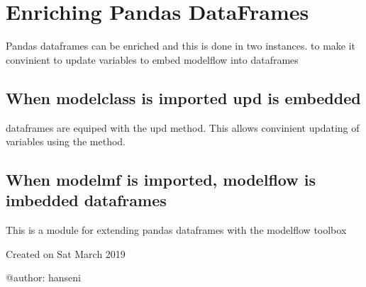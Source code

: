 \documentclass[letterpaper,10pt,english]{sphinxmanual}
\begin{document}
\chapter{Enriching Pandas DataFrames}
\label{\detokenize{index:enriching-pandas-dataframes}}
\sphinxAtStartPar
Pandas dataframes can be enriched and this is done in two instances.
\sphinxhyphen{} to make it convinient to update variables
\sphinxhyphen{} to embed modelflow into dataframes


\section{When modelclass is imported upd is embedded}
\label{\detokenize{index:when-modelclass-is-imported-upd-is-embedded}}
\sphinxAtStartPar
dataframes are equiped with the upd method. This allows convinient
updating of variables using the {\hyperref[\detokenize{index:modelclass.Model_help_Mixin.update}]{}} method.


\section{When modelmf is imported, modelflow is imbedded dataframes}
\label{\detokenize{index:module-modelmf}}\label{\detokenize{index:when-modelmf-is-imported-modelflow-is-imbedded-dataframes}}
\sphinxAtStartPar
This is a module for extending pandas dataframes with the modelflow toolbox

\sphinxAtStartPar
Created on Sat March 2019

\sphinxAtStartPar
@author: hanseni
\end{document}
